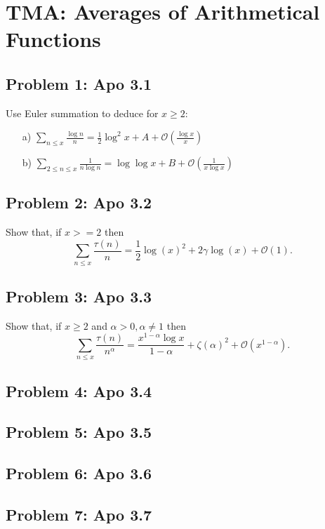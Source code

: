 \section{TMA: Averages of Arithmetical Functions}

\subsection[Problem 1]{Problem 1: Apo 3.1}
Use Euler summation to deduce for $x \geq 2:$
\begin{itemize}
    \item[a)] $\sum_{n \leqslant x} \frac{\log{n}}{n} = \frac{1}{2} \log^2{x} + A + \mathcal{O}(\frac{\log{x}}{x})$
    \item[b)] $\sum_{2 \leqslant n \leqslant x} \frac{1}{n \log{n}} = \log{\log{x}} + B + \mathcal{O}(\frac{1}{x \log{x}})$
\end{itemize}

\subsection[Problem 2]{Problem 2: Apo 3.2}
Show that, if $x >= 2$ then
$$\sum_{n \leqslant x} \frac{\tau(n)}{n} = \frac{1}{2}\log(x)^2 + 2 \gamma \log(x) + \mathcal{O}(1).$$

\subsection[Problem 3]{Problem 3: Apo 3.3}
Show that, if $x \geq 2$ and $\alpha > 0, \alpha \neq 1$ then
$$\sum_{n \leqslant x} \frac{\tau(n)}{n^\alpha} = \frac{x^{1-\alpha}\log{x}}{1-\alpha} + \zeta(\alpha)^2
+ \mathcal{O}(x^{1-\alpha}).$$

\subsection[Problem 4]{Problem 4: Apo 3.4}

\subsection[Problem 5]{Problem 5: Apo 3.5}

\subsection[Problem 6]{Problem 6: Apo 3.6}

\subsection[Problem 7]{Problem 7: Apo 3.7}

